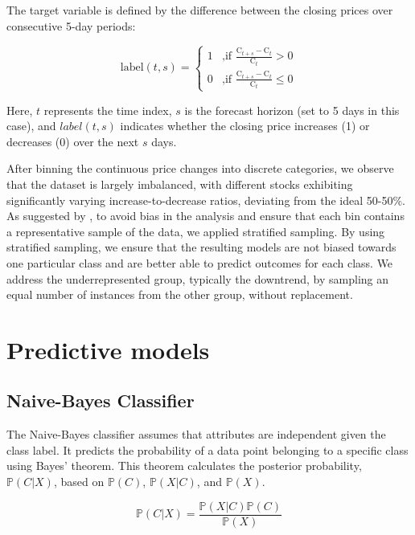 \documentclass[aodsor,preprint]{imsart}
\numberwithin{equation}{section}
\theoremstyle{plain}
\begin{document}
The target variable is defined by the difference between the closing prices over consecutive 5-day periods:

$$
\text{label}(t,s) = 
\begin{cases} 
1 & \text{,if } \frac{\text{C}_{t+s} - \text{C}_t}{\text{C}_t} > 0 \\
0 & \text{,if } \frac{\text{C}_{t+s} - \text{C}_t}{\text{C}_t} \leq 0
\end{cases}
$$

Here, $t$ represents the time index, $s$ is the forecast horizon (set to 5 days in this case), and $label(t,s)$ indicates whether the closing price increases (1) or decreases (0) over the next $s$ days.

After binning the continuous price changes into discrete categories, we observe that the dataset is largely imbalanced, with different stocks exhibiting significantly varying increase-to-decrease ratios, deviating from the ideal 50-50\%. As suggested by \cite{pagliaro2023}, to avoid bias in the analysis and ensure that each bin contains a representative sample of the data, we applied stratified sampling. By using stratified sampling, we ensure that the resulting models are not biased towards one particular class and are better able to predict outcomes for each class. We address the underrepresented group, typically the downtrend, by sampling an equal number of instances from the other group, without replacement.


\section{Predictive models}

\subsection{Naive-Bayes Classifier}
\label{sec:Sub}

The Naive-Bayes classifier assumes that attributes are independent given the class label. It predicts the probability of a data point belonging to a specific class using Bayes’ theorem. This theorem calculates the posterior probability, $\mathbb{P}(C|X)$, based on $\mathbb{P}(C)$, $\mathbb{P}(X|C)$, and $\mathbb{P}(X)$.

\begin{equation}
\mathbb{P}(C|X) = \frac{\mathbb{P}(X|C)\mathbb{P}(C)}{\mathbb{P}(X)}
\end{equation}
\end{document}
